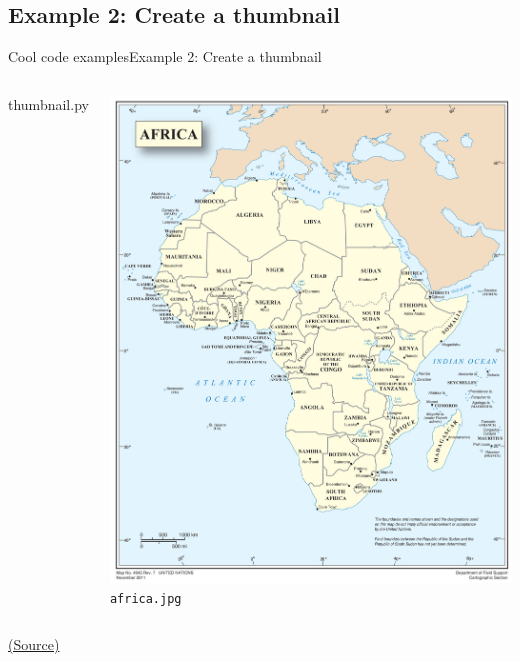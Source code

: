 \documentclass[10pt,compress]{beamer} %
\begin{document}
\subsection{Example 2: Create a thumbnail}
\begin{frame}[plain]{Cool code examples}{Example 2: Create a thumbnail}
	\begin{columns}

		\vspace{-0.2cm}
		\begin{exampleblock}{thumbnail.py}
		\vspace{-0.2cm}
		
		\vspace{-0.2cm}
		\end{exampleblock}

		

		\vspace{-0.2cm}
		\centering \includegraphics[width=\linewidth]{figs/africa.jpg}\\
	 	\texttt{africa.jpg}
	\end{columns}
		\vspace{-0.2cm}
	\centering \tiny{\href{http://www.pythonforbeginners.com/gui/how-to-use-pillow}{(Source)}}
\end{frame}
\end{document}
